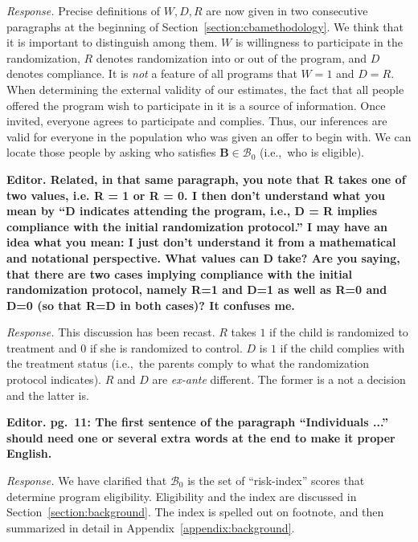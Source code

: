 \noindent \textit{Response.} Precise definitions of $W, D, R$ are now given in two consecutive paragraphs at the beginning of Section~\ref{section:cbamethodology}. We think that it is important to distinguish among them. $W$ is willingness to participate in the randomization, $R$ denotes randomization into or out of the program, and $D$ denotes compliance. It is \textit{not} a feature of all programs that $W = 1$ and $D = R$. When determining the external validity of our estimates, the fact that all people offered the program wish to participate in it is a source of information. Once invited, everyone agrees to participate and complies. Thus, our inferences are valid for everyone in the population who was given an offer to begin with. We can locate those people by asking who satisfies $\bm{B} \in \mathcal{B}_0$ (i.e.,\ who is eligible).

\noindent \textbf{Editor. Related, in that same paragraph, you note that R takes one of two values, i.e. R = 1 or R = 0. I then don't understand what you mean by ``D indicates attending the program, i.e., D = R implies compliance with the initial randomization protocol.'' I may have an idea what you mean: I just don't understand it from a mathematical and notational perspective. What values can D take? Are you saying, that there are two cases implying compliance with the initial randomization protocol, namely R=1 and D=1 as well as R=0 and D=0 (so that R=D in both cases)? It confuses me.}

\noindent \textit{Response.} This discussion has been recast. $R$ takes $1$ if the child is randomized to treatment and $0$ if she is randomized to control. $D$ is $1$ if the child complies with the treatment status (i.e.,\ the parents comply to what the randomization protocol indicates). $R$ and $D$ are \textit{ex-ante} different. The former is a not a decision and the latter is.

\noindent \textbf{Editor. pg.\ 11: The first sentence of the paragraph ``Individuals ...'' should need one or several extra words at the end to make it proper English.}

\noindent \textit{Response.} We have clarified that $\mathcal{B}_0$ is the set of ``risk-index'' scores that determine program eligibility. Eligibility and the index are discussed in Section~\ref{section:background}. The index is spelled out on footnote, and then summarized in detail in Appendix~\ref{appendix:background}.

